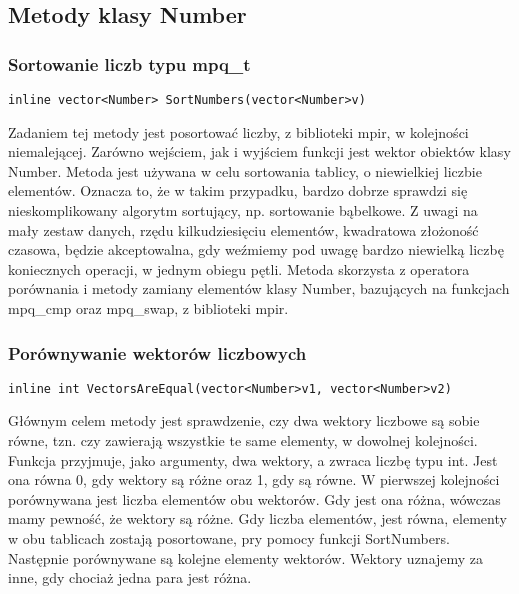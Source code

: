 \documentclass[twoside,a4paper]{book}
\begin{document}
\subsection{Metody klasy Number}

\subsubsection{Sortowanie liczb typu mpq\_t}
\begin{lstlisting}
inline vector<Number> SortNumbers(vector<Number>v)
\end{lstlisting}

Zadaniem tej metody jest posortować liczby, z biblioteki mpir, w kolejności niemalejącej. Zarówno wejściem, jak i wyjściem funkcji jest wektor obiektów klasy Number. Metoda jest używana w celu sortowania tablicy, o niewielkiej liczbie elementów. Oznacza to, że w takim przypadku, bardzo dobrze sprawdzi się nieskomplikowany algorytm sortujący, np. sortowanie bąbelkowe. Z uwagi na mały zestaw danych, rzędu kilkudziesięciu elementów, kwadratowa złożoność czasowa, będzie akceptowalna, gdy weźmiemy pod uwagę bardzo niewielką liczbę koniecznych operacji, w jednym obiegu pętli. Metoda skorzysta z operatora porównania i metody zamiany elementów klasy Number, bazujących na funkcjach mpq\_cmp oraz mpq\_swap, z biblioteki mpir.
\\

\subsubsection{Porównywanie wektorów liczbowych}
\begin{lstlisting}
inline int VectorsAreEqual(vector<Number>v1, vector<Number>v2)
\end{lstlisting}

Głównym celem metody jest sprawdzenie, czy dwa wektory liczbowe są sobie równe, tzn. czy zawierają wszystkie te same elementy, w dowolnej kolejności. Funkcja przyjmuje, jako argumenty, dwa wektory, a zwraca liczbę typu int. Jest ona równa 0, gdy wektory są różne oraz 1, gdy są równe. W pierwszej kolejności porównywana jest liczba elementów obu wektorów. Gdy jest ona różna, wówczas mamy pewność, że wektory są różne. Gdy liczba elementów, jest równa, elementy w obu tablicach zostają posortowane, pry pomocy funkcji SortNumbers. Następnie porównywane są kolejne elementy wektorów. Wektory uznajemy za inne, gdy chociaż jedna para jest różna.
\\
\end{document}
